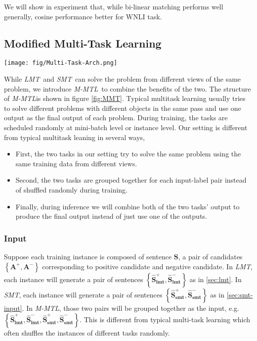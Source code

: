 \documentclass[11pt,a4paper]{article}
\newcommand{\lmt}{\textit{LMT}}
\newcommand{\smt}{\textit{SMT}}
\newcommand{\mmt}{\textit{M-MTL}}
\begin{document}
We will show in experiment that, while bi-linear matching performs well generally, cosine performance better for WNLI task.

\subsection{Modified Multi-Task Learning}
\label{sec:mmt}

\begin{figure*}[ht!]
	\centering
{
	\texttt{[image: fig/Multi-Task-Arch.png]}
    }
\caption{Multi-Task Architecture}
\label{fig:MMT}
\end{figure*}

While \lmt~and \smt~can solve the problem from different views of the same problem, we introduce \mmt~to combine the benefits of the two.
The structure of \mmt is shown in figure \ref{fig:MMT}. Typical multitask learning usually tries to solve different problems with different objects in the same pass and use one output as the final output of each problem. During training, the tasks are scheduled randomly at mini-batch level or instance level. Our setting is different from typical multitask leaning in several ways,
\begin{itemize}
    \item First, the two tasks in our setting try to solve the same problem using the same training data from different views. 
    \item Second, the two tasks are grouped together for each input-label pair instead of shuffled randomly during training. 
    \item Finally, during inference we will combine both of the two tasks' output to produce the final output instead of just use one of the outputs.
\end{itemize}
\subsubsection{Input}
Suppose each training instance is composed of sentence $\mathbf{S}$, a pair of candidates $\left\{\mathbf{A^+},\mathbf{A^-}\right\}$ corresponding to positive candidate and negative candidate. In \lmt, each instance will generate a pair of sentences $\left\{\mathbf{\hat{S}^+_{lmt}}, \mathbf{\hat{S}^-_{lmt}}\right\}$ as in \ref{sec:lmt}. In \smt, each instance will generate a pair of sentences $\left\{\mathbf{\hat{S}^+_{smt}}, \mathbf{\hat{S}^-_{smt}}\right\}$ as in \ref{sec:smt-input}. In \mmt, those two pairs will be grouped together as the input, e.g. $\left\{\mathbf{\hat{S}^+_{lmt}}, \mathbf{\hat{S}^-_{lmt}},\mathbf{\hat{S}^+_{smt}}, \mathbf{\hat{S}^-_{smt}}\right\}$. This is different from typical multi-task learning which often shuffles the instances of different tasks randomly.
\end{document}
